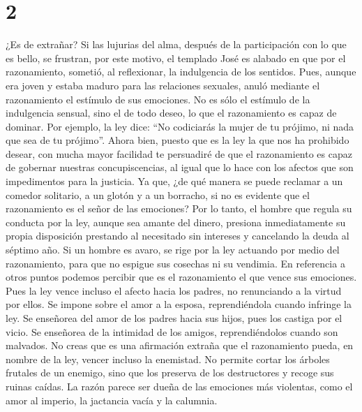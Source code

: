 \hypertarget{section-1}{%
\section{2}\label{section-1}}

 ¿Es de extrañar? Si las lujurias del alma, después de la
participación con lo que es bello, se frustran,  por este
motivo, el templado José es alabado en que por el razonamiento, sometió,
al reflexionar, la indulgencia de los sentidos.  Pues,
aunque era joven y estaba maduro para las relaciones sexuales, anuló
mediante el razonamiento el estímulo de sus emociones.  No
es sólo el estímulo de la indulgencia sensual, sino el de todo deseo, lo
que el razonamiento es capaz de dominar.  Por ejemplo, la
ley dice: ``No codiciarás la mujer de tu prójimo, ni nada que sea de tu
prójimo''.  Ahora bien, puesto que es la ley la que nos ha
prohibido desear, con mucha mayor facilidad te persuadiré de que el
razonamiento es capaz de gobernar nuestras concupiscencias, al igual que
lo hace con los afectos que son impedimentos para la justicia.
 Ya que, ¿de qué manera se puede reclamar a un comedor
solitario, a un glotón y a un borracho, si no es evidente que el
razonamiento es el señor de las emociones?  Por lo tanto,
el hombre que regula su conducta por la ley, aunque sea amante del
dinero, presiona inmediatamente su propia disposición prestando al
necesitado sin intereses y cancelando la deuda al séptimo año.
 Si un hombre es avaro, se rige por la ley actuando por
medio del razonamiento, para que no espigue sus cosechas ni su vendimia.
En referencia a otros puntos podemos percibir que es el razonamiento el
que vence sus emociones.  Pues la ley vence incluso el
afecto hacia los padres, no renunciando a la virtud por ellos.
 Se impone sobre el amor a la esposa, reprendiéndola
cuando infringe la ley.  Se enseñorea del amor de los
padres hacia sus hijos, pues los castiga por el vicio. Se enseñorea de
la intimidad de los amigos, reprendiéndolos cuando son malvados.
 No creas que es una afirmación extraña que el
razonamiento pueda, en nombre de la ley, vencer incluso la enemistad.
 No permite cortar los árboles frutales de un enemigo,
sino que los preserva de los destructores y recoge sus ruinas caídas.
 La razón parece ser dueña de las emociones más
violentas, como el amor al imperio, la jactancia vacía y la calumnia.
